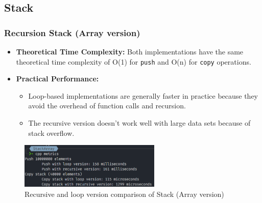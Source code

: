\thispagestyle{empty}
\subsection{Stack}
\subsubsection*{Recursion Stack (Array version)}
\begin{itemize}
	\item \textbf{Theoretical Time Complexity:} Both implementations have the same theoretical time complexity of O(1) for \verb|push| and O(n) for \verb|copy| operations.
	\item \textbf{Practical Performance:}
	      \begin{itemize}
		      \item  Loop-based implementations are generally faster in practice because they avoid the overhead of function calls and recursion.
		      \item The recursive version doesn't work well with large data sets because of stack overflow.
	      \end{itemize}
\end{itemize}
\begin{figure}[!ht]
	\centering
	\includegraphics[width=0.6\textwidth]{imgs/StackArray/metrics.png}
	\caption{Recursive and loop version comparison of Stack (Array version)}\label{fig:stack_arr_metrics}
\end{figure}

